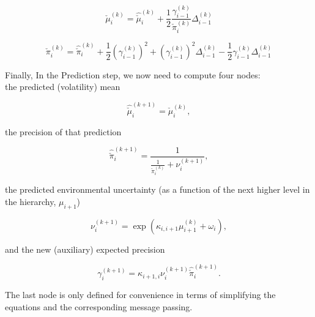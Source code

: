 \begin{equation}
	\check{\mu}_i^{(k)} = \hat{\check{\mu}}_i^{(k)} + \frac{1}{2} \frac{\gamma_{i-1}^{(k)}}{\check{\pi}_i^{(k)}} \Delta_{i-1}^{(k)}
\end{equation}

\begin{equation}
	\check{\pi}_i^{(k)} = \hat{\check{\pi}}_i^{(k)} + \frac{1}{2} (\gamma_{i-1}^{(k)})^2 + (\gamma_{i-1}^{(k)})^2 \Delta_{i-1}^{(k)} - \frac{1}{2} \gamma_{i-1}^{(k)} \Delta_{i-1}^{(k)}
\end{equation}

Finally, In the \textsf{Prediction} step, we now need to compute four nodes: \\
the predicted (volatility) mean

\begin{equation}
	\hat{\check{\mu}}_i^{(k+1)} = \check{\mu}_i^{(k)},
\end{equation}

the precision of that prediction

\begin{equation}
  \hat{\check{\pi}}_i^{(k+1)} = \frac{1}{\frac{1}{\check{\pi}_i^{(k)}} + \nu_i^{(k+1)}}, 
\end{equation}

the predicted environmental uncertainty (as a function of the next higher level in the hierarchy, $\mu_{i+1}$)

\begin{equation}
  \nu_i^{(k+1)} = \exp(\kappa_{i,i+1} \mu_{i+1}^{(k)} + \omega_i),
\end{equation}

and the new (auxiliary) expected precision

\begin{equation}
  \gamma_i^{(k+1)} = \kappa_{i+1,i} \nu_i^{(k+1)} \hat{\check{\pi}}_i^{(k+1)}.
\end{equation}

The last node is only defined for convenience in terms of simplifying the equations and the corresponding message passing.